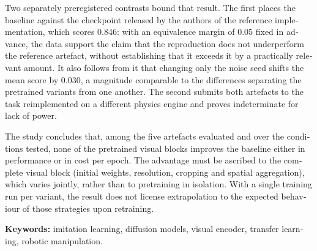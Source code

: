 \begin{otherlanguage}{english}
Two separately preregistered contrasts bound that result. The first places the baseline
against the checkpoint released by the authors of the reference implementation, which scores
\num{0.846}: with an equivalence margin of \num{0.05} fixed in advance, the data support the
claim that the reproduction does not underperform the reference artefact, without
establishing that it exceeds it by a practically relevant amount. It also follows from it
that changing only the noise seed shifts the mean score by \num{0.030}, a magnitude
comparable to the differences separating the pretrained variants from one another. The
second submits both artefacts to the task reimplemented on a different physics engine and
proves indeterminate for lack of power.

The study concludes that, among the five artefacts evaluated and over the conditions tested,
none of the pretrained visual blocks improves the baseline either in performance or in cost
per epoch. The advantage must be ascribed to the complete visual block (initial weights,
resolution, cropping and spatial aggregation), which varies jointly, rather than to
pretraining in isolation. With a single training run per variant, the result does not license
extrapolation to the expected behaviour of those strategies upon retraining.

\vspace{0.8em}
\noindent\textbf{Keywords:} imitation learning, diffusion models, visual encoder, transfer
learning, robotic manipulation.
\end{otherlanguage}
